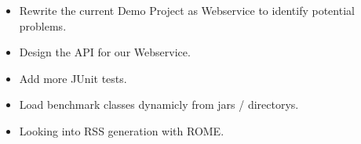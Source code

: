 \begin{itemize}
    \item Rewrite the current Demo Project as Webservice to identify potential problems.
    \item Design the API for our Webservice.
    \item Add more JUnit tests.
    \item Load benchmark classes dynamicly from jars / directorys.
    \item Looking into RSS generation with ROME.
\end{itemize}